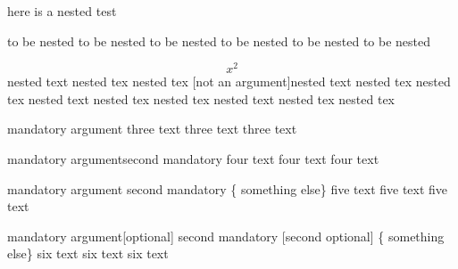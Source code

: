 here is a nested test
\begin{one}
	to be nested to be nested
	to be nested to be nested
	to be nested to be nested
	\begin{two}
		\[ x^2\]
		nested text nested tex nested tex [not an argument]nested text nested tex nested tex
		nested text nested tex nested tex
		nested text nested tex nested tex
	\end{two}
\end{one}
\begin{three}{mandatory argument}
	three text
	three text
	three text
\end{three}
\begin{four}{mandatory argument}{second mandatory}
	four text
	four text
	four text
\end{four}
\begin{five}[optional] {mandatory argument} {second mandatory}
	\{ something else\}
	five text
	five text
	five text
\end{five}
\begin{six} {mandatory argument}[optional] {second mandatory}    [second optional]
	\{ something else\}
	six text
	six text
	six text
\end{six}
